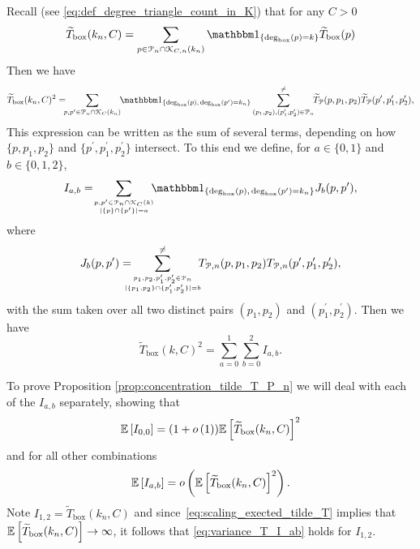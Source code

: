 Recall (see \eqref{eq:def_degree_triangle_count_in_K}) that for any $C > 0$
\[
	\widetilde{T}_{\text{box}}(k_n,C) = \sum_{p \in \Pcal_n \cap \Kcal_{C,n}(k_n)} \ind{\text{deg}_{\text{box}}(p) = k} \widetilde{T}_{\text{box}}(p)
\]
Then we have
\[
	\widetilde{T}_{\text{box}}(k_n,C)^2 = \hspace{-5pt} \sum_{p, p^\prime \in \Pcal_n \cap \Kcal_C(k_n)}
		\hspace{-3pt} \ind{\Dbox(p), \, \Dbox(p^\prime) = k_n} 
		\sum_{(p_1, p_2), (p_1^\prime, p_2^\prime) \in \Pcal_n}^{\ne} \hspace{-3pt}
		\widetilde{T}_{\Pcal}(p,p_1,p_2) \widetilde{T}_{\Pcal}(p^\prime, p_1^\prime, p_2^\prime),
\]
This expression can be written as the sum of several terms, depending on how $\{p, p_1, p_2\}$ and $\{p^\prime, p_1^\prime, p_2^\prime\}$ intersect. To this end we define, for $a \in \{0,1\}$ and $b \in \{0,1,2\}$,
\[
	I_{a,b} = \hspace{-3pt} \sum_{p, p^\prime \in \Pcal_n \cap \Kcal_C(k) \atop |\{p\} \cap \{p^\prime\}| = a}
	\hspace{-5pt} \ind{\Dbox(p), \, \Dbox(p^\prime) = k_n} J_b(p,p^\prime),
\]
where
\[
	J_b(p,p^\prime) = \hspace{-10pt} \sum_{p_1, p_2, p_1^\prime, p_2^\prime \in \Pcal_n 
		\atop |\{p_1, p_2\} \cap \{p_1^\prime, p_2^\prime\}| = b}^{\ne}
		\hspace{-5pt} T_{\Pcal,n}(p,p_1,p_2) T_{\Pcal,n}(p^\prime, p_1^\prime, p_2^\prime),
\]
with the sum taken over all two distinct pairs $(p_1, p_2)$ and $(p_1^\prime, p_2^\prime)$. Then we have
\[
	\widetilde{T}_{\text{box}}(k, C)^2 = \sum_{a = 0}^1 \sum_{b = 0}^2 I_{a,b}.
\]

To prove Proposition \ref{prop:concentration_tilde_T_P_n} we will deal with each of the $I_{a,b}$ separately, showing that 
\begin{equation}\label{eq:variance_T_I_00}
	\mathbb{E}\left[I_{0,0}\right] = (1+o\left(1\right))\mathbb{E}\left[\widetilde{T}_{\text{box}}(k_n,C)\right]^2
\end{equation}
and for all other combinations
\begin{equation}\label{eq:variance_T_I_ab}
	\mathbb{E}\left[I_{a,b}\right] = o\left(\mathbb{E}\left[\widetilde{T}_{\text{box}}(k_n,C)\right]^2\right).
\end{equation}
Note $I_{1,2} = \widetilde{T}_{\text{box}}(k_n,C)$ and since~\eqref{eq:scaling_exected_tilde_T} implies that $\mathbb{E}\left[\widetilde{T}_{\text{box}}(k_n,C)\right] \to \infty$, it follows that \eqref{eq:variance_T_I_ab} holds for $I_{1,2}$. 

